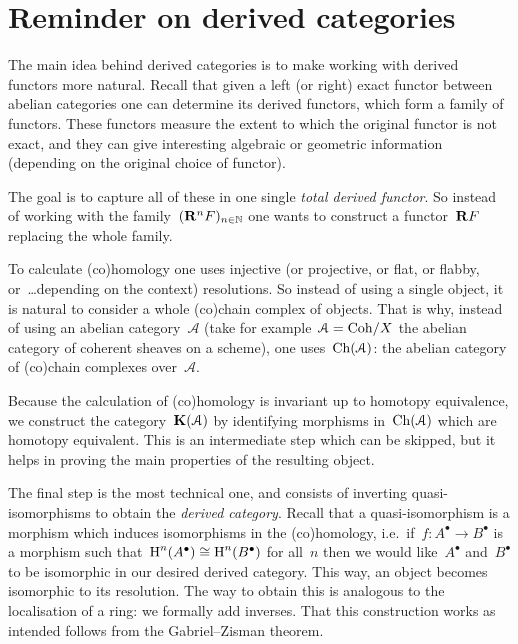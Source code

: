 \documentclass[10pt,a4paper]{article}
\begin{document}
\section{Reminder on derived categories}
\label{section:derived-categories}
The main idea behind derived categories is to make working with derived functors more natural. Recall that given a left (or right) exact functor between abelian categories one can determine its derived functors, which form a family of functors. These functors measure the extent to which the original functor is not exact, and they can give interesting algebraic or geometric information (depending on the original choice of functor).

The goal is to capture all of these in one single \emph{total derived functor}. So instead of working with the family~$(\mathbf{R}^nF)_{n\in\mathbb{N}}$ one wants to construct a functor~$\mathbf{R} F$ replacing the whole family.

To calculate (co)homology one uses injective (or projective, or flat, or flabby, or~\dots depending on the context) resolutions. So instead of using a single object, it is natural to consider a whole (co)chain complex of objects. That is why, instead of using an abelian category~$\mathcal{A}$ (take for example~$\mathcal{A}=\mathrm{Coh}/X$ the abelian category of coherent sheaves on a scheme), one uses~$\operatorname{Ch}(\mathcal{A})$: the abelian category of (co)chain complexes over~$\mathcal{A}$.

Because the calculation of (co)homology is invariant up to homotopy equivalence, we construct the category~$\mathbf{K}(\mathcal{A})$ by identifying morphisms in~$\operatorname{Ch}(\mathcal{A})$ which are homotopy equivalent. This is an intermediate step which can be skipped, but it helps in proving the main properties of the resulting object.

The final step is the most technical one, and consists of inverting quasi-isomorphisms to obtain the \emph{derived category}. Recall that a quasi-isomorphism is a morphism which induces isomorphisms in the (co)homology, i.e.\ if~$f\colon A^\bullet\to B^\bullet$ is a morphism such that~$\operatorname{H}^n(A^\bullet)\cong\operatorname{H}^n(B^\bullet)$ for all~$n$ then we would like~$A^\bullet$ and~$B^\bullet$ to be isomorphic in our desired derived category. This way, an object becomes isomorphic to its resolution. The way to obtain this is analogous to the localisation of a ring: we formally add inverses. That this construction works as intended follows from the Gabriel--Zisman theorem.
\end{document}
